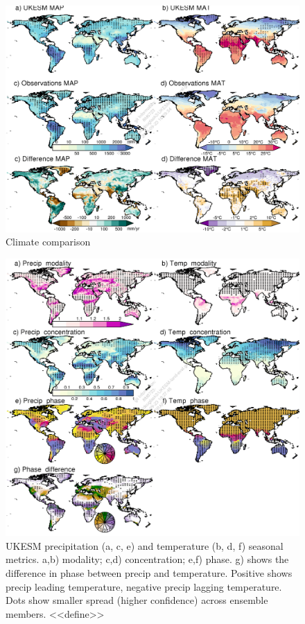\begin{figure}[t]
    \includegraphics[width=12cm]{figs/Climate/annual_average_clims.png}
    \caption{Climate comparison \label{fig:ClimateAAMaps}}
\end{figure}

\begin{figure}[t]
    \includegraphics[width=12cm]{figs/Climate/climStuff-UKESM.png}
    \caption{UKESM precipitation (a, c, e) and temperature (b, d, f) seasonal metrics. a,b) modality; c,d) concentration; e,f) phase. g) shows the difference in phase between precip and temperature. Positive shows precip leading temperature, negative precip lagging temperature. Dots show smaller spread (higher confidence) across ensemble members. <<define>>  \label{fig:ClimateSeasonUKESMmaps}}
\end{figure}

